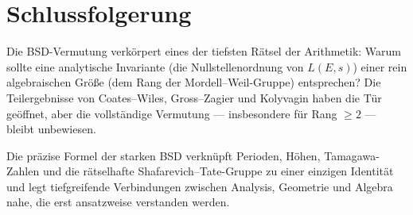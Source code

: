 \documentclass[12pt,a4paper]{article}
\theoremstyle{remark}
\begin{document}
\section{Schlussfolgerung}

Die BSD-Vermutung verkörpert eines der tiefsten Rätsel der Arithmetik: Warum sollte
eine analytische Invariante (die Nullstellenordnung von $L(E,s)$) einer rein algebraischen
Größe (dem Rang der Mordell--Weil-Gruppe) entsprechen? Die Teilergebnisse von
Coates--Wiles, Gross--Zagier und Kolyvagin haben die Tür geöffnet, aber die vollständige
Vermutung — insbesondere für Rang $\geq 2$ — bleibt unbewiesen.

Die präzise Formel der starken BSD verknüpft Perioden, Höhen, Tamagawa-Zahlen und die
rätselhafte Shafarevich--Tate-Gruppe zu einer einzigen Identität und legt tiefgreifende
Verbindungen zwischen Analysis, Geometrie und Algebra nahe, die erst ansatzweise
verstanden werden.
\end{document}
